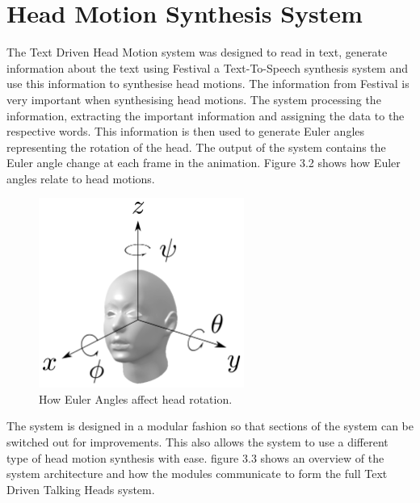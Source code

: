 \documentclass[bsc,frontabs,twoside,singlespacing,parskip]{infthesis}
\begin{document}
\section{Head Motion Synthesis System}

The Text Driven Head Motion system was designed to read in text, generate information about the text using Festival a Text-To-Speech synthesis system and use this information to synthesise head motions. The information from Festival is very important when synthesising head motions. The system processing the information, extracting the important information and assigning the data to the respective words. This information is then used to generate Euler angles representing the rotation of the head. The output of the system contains the Euler angle change at each frame in the animation. Figure 3.2 shows how Euler angles relate to head motions.

\begin{figure}
	\centering
	\includegraphics[width=0.6\textwidth]{head_with_euler.png}
	\caption{How Euler Angles affect head rotation.}
\end{figure}

The system is designed in a modular fashion so that sections of the system can be switched out for improvements. This also allows the system to use a different type of head motion synthesis with ease. figure 3.3 shows an overview of the system architecture and how the modules communicate to form the full Text Driven Talking Heads system.

\end{document}
